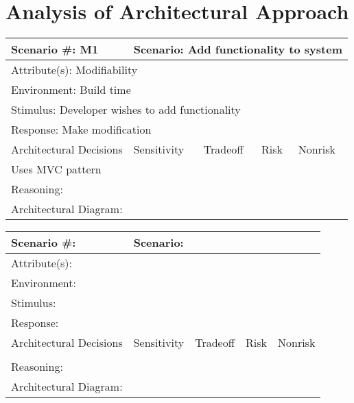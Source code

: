 \section{Analysis of Architectural Approach}

\begin{tabular}{|m{}|m{}|m{}|m{}|m{}|m{}|}
  \hline
  Scenario \#: M1 & \multicolumn{5}{m{0.75 \textwidth}|}{Scenario: Add functionality to system} \\ \hline
  \multicolumn{6}{|m{0.9 \textwidth}|}{Attribute(s): Modifiability} \\ \hline
  \multicolumn{6}{|m{0.9 \textwidth}|}{Environment: Build time} \\ \hline
  \multicolumn{6}{|m{0.9 \textwidth}|}{Stimulus: Developer wishes to add functionality} \\ \hline
  \multicolumn{6}{|m{0.9 \textwidth}|}{Response: Make modification} \\ \hline
  \multicolumn{2}{|m{0.3 \textwidth}|}{Architectural Decisions} & Sensitivity & Tradeoff & Risk & Nonrisk \\ \hline
  \multicolumn{2}{|m{0.3 \textwidth}|}{Uses MVC pattern} &  &  &  &  \\ \hline
  \multicolumn{6}{|m{0.9 \textwidth}|}{Reasoning:} \\ \hline
  \multicolumn{6}{|m{0.9 \textwidth}|}{Architectural Diagram: } \\ \hline
\end{tabular}

\begin{tabular}{|m{}|m{}|m{}|m{}|m{}|m{}|}
  \hline
  Scenario \#: & \multicolumn{5}{m{0.75 \textwidth}|}{Scenario:} \\ \hline
  \multicolumn{6}{|m{0.9 \textwidth}|}{Attribute(s):} \\ \hline
  \multicolumn{6}{|m{0.9 \textwidth}|}{Environment:} \\ \hline
  \multicolumn{6}{|m{0.9 \textwidth}|}{Stimulus:} \\ \hline
  \multicolumn{6}{|m{0.9 \textwidth}|}{Response:} \\ \hline
  \multicolumn{2}{|m{0.3 \textwidth}|}{Architectural Decisions} & Sensitivity & Tradeoff & Risk & Nonrisk \\ \hline
  \multicolumn{2}{|m{0.3 \textwidth}|}{} &  &  &  &  \\ \hline
  \multicolumn{6}{|m{0.9 \textwidth}|}{Reasoning:} \\ \hline
  \multicolumn{6}{|m{0.9 \textwidth}|}{Architectural Diagram: } \\ \hline
\end{tabular}

